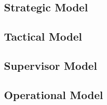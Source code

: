 \newpage
\subsection*{Strategic Model}

\newpage
\subsection*{Tactical Model}

\newpage
\subsection*{Supervisor Model}

\newpage
\subsection*{Operational Model}

